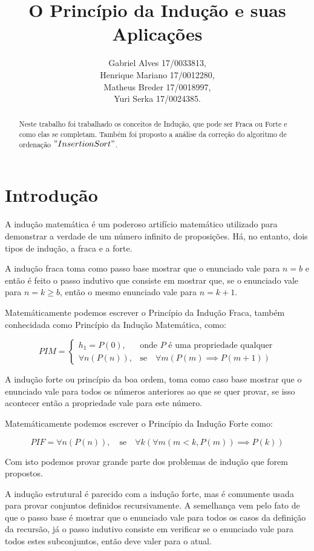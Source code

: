 \documentclass[a4paper, 10pt]{article}
\title{\LARGE \bf
O Princípio da Indução e suas Aplicações
}
\author{Gabriel Alves 17/0033813, \\
        Henrique Mariano 17/0012280, \\
        Matheus Breder 17/0018997, \\
        Yuri Serka 17/0024385.}
\begin{document}
\maketitle

\begin{abstract}

Neste trabalho foi trabalhado os conceitos de Indução, que pode ser Fraca ou Forte e como elas se completam. Também foi proposto a análise da correção do algoritmo de ordenação $"Insertion Sort"$.

\end{abstract}

\section{Introdução}

A indução matemática é um poderoso artifício matemático utilizado para demonstrar a verdade de um número infinito de proposições. Há, no entanto, dois tipos de indução, a fraca e a forte.

A indução fraca toma como passo base mostrar que o enunciado vale para $n = b$ e então é feito o passo indutivo que consiste em mostrar que, se o enunciado vale para $n = k \geq{b} $, então o mesmo enunciado vale para $n = k + 1$.

Matemáticamente podemos escrever o Princípio da Indução Fraca, também conhecidada como Princípio da Indução Matemática, como:

$$
PIM = \begin{cases}
h_1 = P(0), &\mbox{onde } P\mbox{ é uma propriedade qualquer}\\
\forall{n}(P(n)), &\mbox{se}\quad \forall{m}(P(m) \implies P(m+1))
\end{cases}
$$

A indução forte ou princípio da boa ordem, toma como caso base mostrar que o enunciado vale para todos os números anteriores ao que se quer provar, se isso acontecer então a propriedade vale para este número.

Matemáticamente podemos escrever o Princípio da Indução Forte como:

$$
PIF = \forall{n}(P(n)), \quad\mbox{se}\quad\forall{k}(\forall{m}(m < k, P(m)) \implies P(k))
$$

Com isto podemos provar grande parte dos problemas de indução que forem propostos.


A indução estrutural é parecido com a indução forte, mas é comumente usada para provar conjuntos definidos recursivamente. A semelhança vem pelo fato de que o passo base é mostrar que o enunciado vale para todos os casos da definição da recursão, já o passo indutivo consiste em verificar se o enunciado vale para todos estes subconjuntos, então deve valer para o atual.
\end{document}
